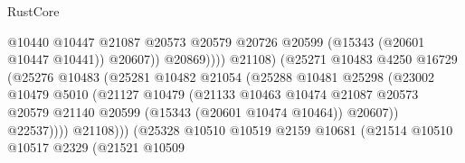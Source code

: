 \begin{lexlean}{RustCore}
\begin{coremodule}
                                                  @10440
                                                  @10447
                                                  @21087
                                                  @20573
                                                  @20579
                                                  @20726
                                                  @20599
                                                  (@15343 (@20601 @10447 @10441))
                                                  @20607))
                                              @20869))))
                                      @21108)
                                    (@25271
                                      @10483
                                      @4250
                                      @16729
                                      (@25276
                                        @10483
                                        (@25281
                                          @10482
                                          @21054
                                          (@25288
                                            @10481
                                            @25298
                                            (@23002
                                              @10479
                                              @5010
                                              (@21127
                                                @10479
                                                (@21133
                                                  @10463
                                                  @10474
                                                  @21087
                                                  @20573
                                                  @20579
                                                  @21140
                                                  @20599
                                                  (@15343 (@20601 @10474 @10464))
                                                  @20607))
                                              @22537))))
                                      @21108)))
                                (@25328
                                  @10510
                                  @10519
                                  @2159
                                  @10681
                                  (@21514
                                    @10510
                                    @10517
                                    @2329
                                    (@21521
                                      @10509

\end{coremodule}
\end{lexlean}
